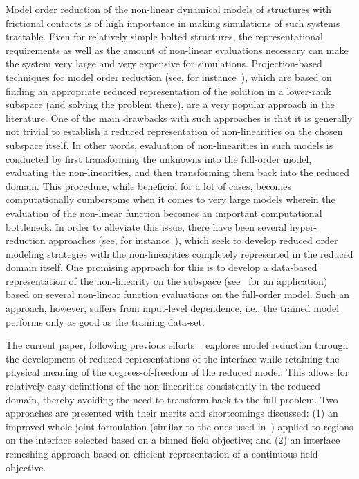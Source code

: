 \documentclass[10pt,print]{article}
\begin{document}
Model order reduction of the non-linear dynamical models of
structures with frictional contacts is of high importance in making
simulations of such systems tractable. Even for relatively
simple bolted structures, the representational requirements as well as
the amount of non-linear evaluations necessary can make the system
very large and very expensive for simulations. Projection-based
techniques for model order reduction (see, for
instance~\cite{mitra2016adaptive}), which are based on finding an
appropriate reduced representation of the solution in a lower-rank
subspace (and solving the problem there), are a very popular
  approach in the literature. One of the main drawbacks with such
approaches is that it is generally not trivial to establish a reduced
representation of non-linearities on the chosen subspace itself. In
other words, evaluation of non-linearities in such models is conducted
by first transforming the unknowns into the full-order model,
evaluating the non-linearities, and then transforming them back into
the reduced domain. This procedure, while beneficial for a lot of
cases, becomes computationally cumbersome when it comes to very large
models wherein the evaluation of the non-linear function becomes an
important computational bottleneck. In order to alleviate this issue,
there have been several hyper-reduction approaches (see, for
  instance~\cite{ryckelynck_priori_2005}), which seek to develop
reduced order modeling strategies with the non-linearities completely
represented in the reduced domain itself. One promising approach for
this is to develop a data-based representation of the non-linearity on
the subspace (see~\cite{jain2019hyper} for an application) based on
several non-linear function evaluations on the full-order model. Such
an approach, however, suffers from input-level dependence, i.e., the
trained model performs only as good as the training data-set.

The current paper, following previous
efforts~\cite{dreher2020gerrymandering}, explores model reduction
through the development of reduced representations of the interface
while retaining the physical meaning of the degrees-of-freedom of the
reduced model. This allows for relatively easy definitions of the
non-linearities consistently in the reduced domain, thereby avoiding
the need to transform back to the full problem. Two approaches are
presented with their merits and shortcomings discussed: (1) an
improved whole-joint formulation (similar to the ones used
in~\cite{lacayo2019updating}) applied to regions on the interface
selected based on a binned field objective; and (2) an interface
remeshing approach based on efficient representation of a continuous
field objective.
\end{document}
